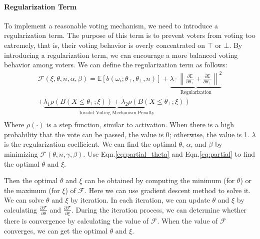\documentclass[11pt]{article}
\begin{document}
  \paragraph{Regularization Term}
  To implement a reasonable voting mechanism, we need to introduce a regularization term. The purpose of this term is to prevent voters from voting too extremely, that is, their voting behavior is overly concentrated on $\top$ or $\bot$. By introducing a regularization term, we can encourage a more balanced voting behavior among voters. We can define the regularization term as follows:
  \begin{equation}
    \label{eq:regularization}
    \begin{aligned}
      \mathcal{F}(\xi, \theta,n,\alpha,\beta)=\mathbb{E}[b(\omega_i;\theta_\top,\theta_\bot,n)] + \underbrace{\lambda\cdot\left\|\frac{\partial{\mathbb{E}}}{\partial{\theta_\top}}+\frac{\partial{\mathbb{E}}}{\partial{\theta_\bot}}\right\|^2}_{\text{Regularization}}\\+\underbrace{\lambda_1\rho(B(X\leq\theta_\top;\xi))+\lambda_2\rho(B(X\leq\theta_\bot;\xi))}_{\text{Invalid Voting Mechanism Penalty}}\\
    \end{aligned}
  \end{equation}
  Where $\rho(\cdot)$ is a step function, similar to activation. When there is a high probability that the vote can be passed, the value is 0; otherwise, the value is 1. $\lambda$ is the regularization coefficient. We can find the optimal $\theta$, $\alpha$, and $\beta$ by minimizing $\mathcal{F}(\theta,n,\gamma,\beta)$.
  Use Eqn.\ref{eq:partial_theta} and Eqn.\ref{eq:partial} to find the optimal $\theta$ and $\xi$.
  
  
  Then the optimal $\theta$ and $\xi$ can be obtained by computing the minimum (for $\theta$) or the maximum (for $\xi$) of $\mathcal{F}$. Here we can use gradient descent method to solve it. We can solve $\theta$ and $\xi$ by iteration. In each iteration, we can update $\theta$ and $\xi$ by calculating $\frac{\partial{\mathcal{F}}}{\partial{\theta}}$ and $\frac{\partial{\mathcal{F}}}{\partial{\xi}}$. During the iteration process, we can determine whether there is convergence by calculating the value of $\mathcal{F}$. When the value of $\mathcal{F}$ converges, we can get the optimal $\theta$ and $\xi$.
  
  
  
\end{document}
